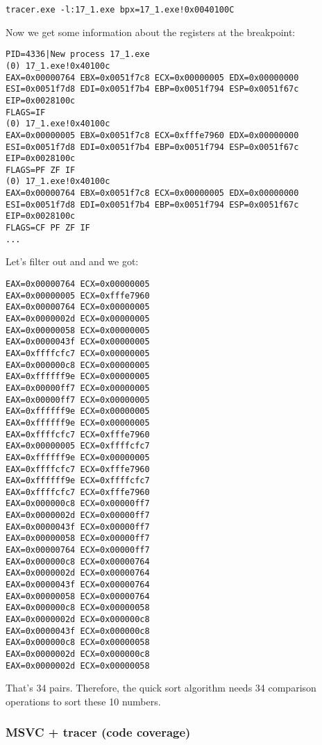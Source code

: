 \begin{lstlisting}
tracer.exe -l:17_1.exe bpx=17_1.exe!0x0040100C
\end{lstlisting}

Now we get some information about the registers at the breakpoint:

\begin{lstlisting}
PID=4336|New process 17_1.exe
(0) 17_1.exe!0x40100c
EAX=0x00000764 EBX=0x0051f7c8 ECX=0x00000005 EDX=0x00000000
ESI=0x0051f7d8 EDI=0x0051f7b4 EBP=0x0051f794 ESP=0x0051f67c
EIP=0x0028100c
FLAGS=IF
(0) 17_1.exe!0x40100c
EAX=0x00000005 EBX=0x0051f7c8 ECX=0xfffe7960 EDX=0x00000000
ESI=0x0051f7d8 EDI=0x0051f7b4 EBP=0x0051f794 ESP=0x0051f67c
EIP=0x0028100c
FLAGS=PF ZF IF
(0) 17_1.exe!0x40100c
EAX=0x00000764 EBX=0x0051f7c8 ECX=0x00000005 EDX=0x00000000
ESI=0x0051f7d8 EDI=0x0051f7b4 EBP=0x0051f794 ESP=0x0051f67c
EIP=0x0028100c
FLAGS=CF PF ZF IF
...
\end{lstlisting}

Let's filter out  and  and we got:

\begin{lstlisting}
EAX=0x00000764 ECX=0x00000005
EAX=0x00000005 ECX=0xfffe7960
EAX=0x00000764 ECX=0x00000005
EAX=0x0000002d ECX=0x00000005
EAX=0x00000058 ECX=0x00000005
EAX=0x0000043f ECX=0x00000005
EAX=0xffffcfc7 ECX=0x00000005
EAX=0x000000c8 ECX=0x00000005
EAX=0xffffff9e ECX=0x00000005
EAX=0x00000ff7 ECX=0x00000005
EAX=0x00000ff7 ECX=0x00000005
EAX=0xffffff9e ECX=0x00000005
EAX=0xffffff9e ECX=0x00000005
EAX=0xffffcfc7 ECX=0xfffe7960
EAX=0x00000005 ECX=0xffffcfc7
EAX=0xffffff9e ECX=0x00000005
EAX=0xffffcfc7 ECX=0xfffe7960
EAX=0xffffff9e ECX=0xffffcfc7
EAX=0xffffcfc7 ECX=0xfffe7960
EAX=0x000000c8 ECX=0x00000ff7
EAX=0x0000002d ECX=0x00000ff7
EAX=0x0000043f ECX=0x00000ff7
EAX=0x00000058 ECX=0x00000ff7
EAX=0x00000764 ECX=0x00000ff7
EAX=0x000000c8 ECX=0x00000764
EAX=0x0000002d ECX=0x00000764
EAX=0x0000043f ECX=0x00000764
EAX=0x00000058 ECX=0x00000764
EAX=0x000000c8 ECX=0x00000058
EAX=0x0000002d ECX=0x000000c8
EAX=0x0000043f ECX=0x000000c8
EAX=0x000000c8 ECX=0x00000058
EAX=0x0000002d ECX=0x000000c8
EAX=0x0000002d ECX=0x00000058
\end{lstlisting}

That's 34 pairs.
Therefore, the quick sort algorithm needs 34 comparison operations to sort these 10 numbers.

\clearpage
\subsubsection{MSVC + tracer (code coverage)}

